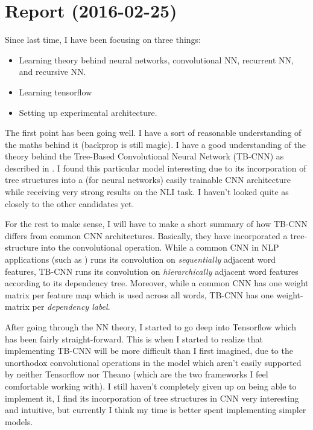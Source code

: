 \section{Report (2016-02-25)}

Since last time, I have been focusing on three things:

\begin{itemize}
	\item Learning theory behind neural networks, convolutional NN, recurrent NN, and recursive NN.
	\item Learning tensorflow
	\item Setting up experimental architecture.
\end{itemize}

The first point has been going well. I have a sort of reasonable understanding of the maths behind it (backprop is still magic). I have a good understanding of the theory behind the Tree-Based Convolutional Neural Network (TB-CNN) as described in \cite{mou_recognizing_2015}. I found this particular model interesting due to its incorporation of tree structures into a (for neural networks) easily trainable CNN architecture while receiving very strong results on the NLI task. I haven't looked quite as closely to the other candidates yet.

For the rest to make sense, I will have to make a short summary of how TB-CNN differs from common CNN architectures. Basically, they have incorporated a tree-structure into the convolutional operation. While a common CNN in NLP applications (such as \cite{kim_convolutional_2014}) runs its convolution on \emph{sequentially} adjacent word features, TB-CNN runs its convolution on \emph{hierarchically} adjacent word features according to its dependency tree. Moreover, while a common CNN has one weight matrix per feature map which is used across all words, TB-CNN has one weight-matrix per \emph{dependency label}.

After going through the NN theory, I started to go deep into Tensorflow which has been fairly straight-forward. This is when I started to realize that implementing TB-CNN will be more difficult than I first imagined, due to the unorthodox convolutional operations in the model which aren't easily supported by neither Tensorflow nor Theano (which are the two frameworks I feel comfortable working with). I still haven't completely given up on being able to implement it, I find its incorporation of tree structures in CNN very interesting and intuitive, but currently I think my time is better spent implementing simpler models.

